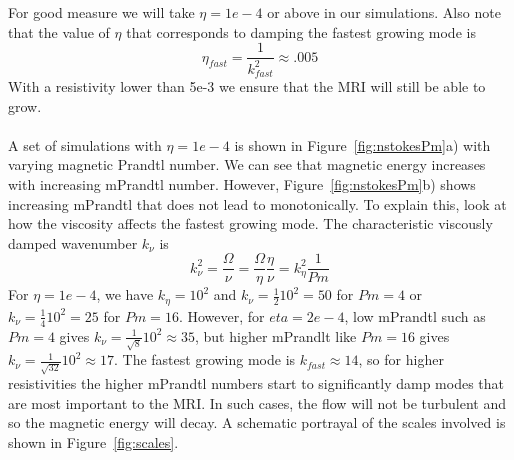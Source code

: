 For good measure we will take $\eta=1e-4$ or above in our simulations. Also note that the value of $\eta$ that corresponds to damping the fastest growing mode is
\begin{equation*}
  \eta_{fast}=\frac1{k^2_{fast}}\approx .005
\end{equation*}
With a resistivity lower than 5e-3 we ensure that the MRI will still be able to grow.\\
\\
A set of simulations with $\eta=1e-4$ is shown in Figure~\ref{fig:nstokesPm}a) with varying magnetic Prandtl number. We can see that magnetic energy increases with increasing mPrandtl number. However, Figure~\ref{fig:nstokesPm}b) shows increasing mPrandtl that does not lead to monotonically. To explain this, look at how the viscosity affects the fastest growing mode. The characteristic viscously damped wavenumber $k_\nu$ is
\begin{equation*}
  k_\nu^2=\frac\Omega\nu=\frac\Omega\eta\frac\eta\nu=k_\eta^2\frac1{Pm}
\end{equation*}
For $\eta=1e-4$, we have $k_\eta=10^2$ and $k_\nu=\frac1210^2=50$ for $Pm=4$ or $k_\nu=\frac1410^2=25$ for $Pm=16$. However, for $eta=2e-4$, low mPrandtl such as $Pm=4$ gives $k_\nu=\frac1{\sqrt{8}}10^2\approx35$, but higher mPrandlt like $Pm=16$ gives $k_\nu=\frac1{\sqrt{32}}10^2\approx17$. The fastest growing mode is $k_{fast}\approx 14$, so for higher resistivities the higher mPrandtl numbers start to significantly damp modes that are most important to the MRI. In such cases, the flow will not be turbulent and so the magnetic energy will decay. A schematic portrayal of the scales involved is shown in Figure~\ref{fig:scales}.
%
